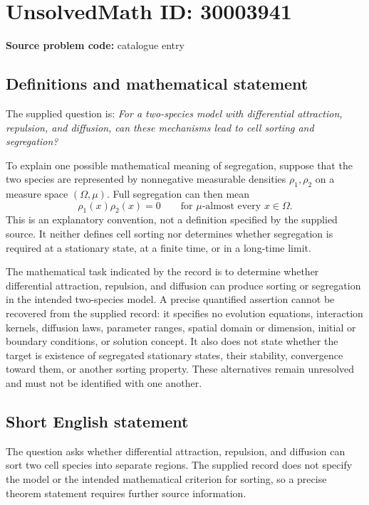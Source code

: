 \documentclass[11pt]{article}
\begin{document}
\section*{UnsolvedMath ID: 30003941}
\textbf{Source problem code:} catalogue entry
\subsection{Definitions and mathematical statement}
The supplied question is: \emph{For a two-species model with differential attraction, repulsion, and diffusion, can these mechanisms lead to cell sorting and segregation?}

To explain one possible mathematical meaning of segregation, suppose that the two species are represented by nonnegative measurable densities \(\rho_1,\rho_2\) on a measure space \((\Omega,\mu)\). Full segregation can then mean
\[
\rho_1(x)\rho_2(x)=0\qquad\text{for }\mu\text{-almost every }x\in\Omega.
\]
This is an explanatory convention, not a definition specified by the supplied source. It neither defines cell sorting nor determines whether segregation is required at a stationary state, at a finite time, or in a long-time limit.

The mathematical task indicated by the record is to determine whether differential attraction, repulsion, and diffusion can produce sorting or segregation in the intended two-species model. A precise quantified assertion cannot be recovered from the supplied record: it specifies no evolution equations, interaction kernels, diffusion laws, parameter ranges, spatial domain or dimension, initial or boundary conditions, or solution concept. It also does not state whether the target is existence of segregated stationary states, their stability, convergence toward them, or another sorting property. These alternatives remain unresolved and must not be identified with one another.
\subsection{Short English statement}
The question asks whether differential attraction, repulsion, and diffusion can sort two cell species into separate regions. The supplied record does not specify the model or the intended mathematical criterion for sorting, so a precise theorem statement requires further source information.
\end{document}
